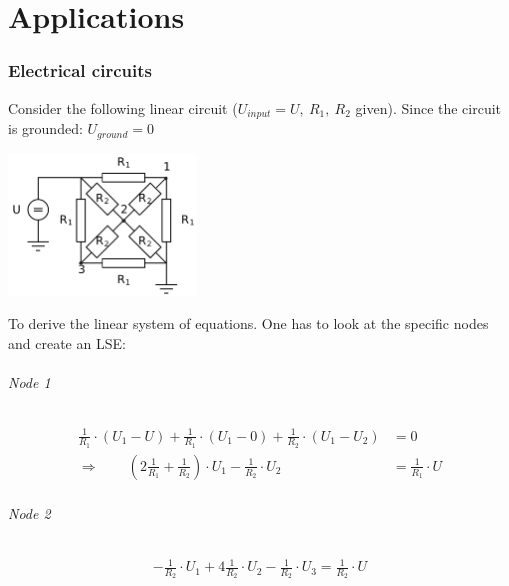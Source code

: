 \part{Applications}

\section{Electrical circuits}
	Consider the following linear circuit ($U_{input}=U,\ R_1,\ R_2$ given). Since the circuit is grounded: $U_{ground} = 0$
	\begin{center}
		\includegraphics[width=5cm]{images/circuit1.pdf}
	\end{center}
	To derive the linear system of equations. One has to look at the specific nodes and create an LSE:
	\paragraph{Node 1}
		\begin{align*}
			\frac{1}{R_1}\cdot (U_1 - U) + \frac{1}{R_1}\cdot(U_1-0) + \frac{1}{R_2}\cdot(U_1 - U_2) &= 0\\
			\Longrightarrow \qquad \left(2 \frac{1}{R_1}+\frac{1}{R_2}\right)\cdot U_1 - \frac{1}{R_2} \cdot U_2 &= \frac{1}{R_1} \cdot U
		\end{align*}
	\paragraph{Node 2}
		\begin{align*}
			-\frac{1}{R_2}\cdot U_1 + 4 \frac{1}{R_2}\cdot U_2 - \frac{1}{R_2}\cdot U_3  = \frac{1}{R_2}\cdot U
		\end{align*}
